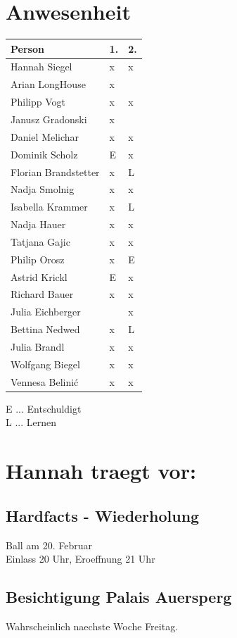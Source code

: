 \documentclass[12pt]{article}
\begin{document}
\ofoot{\pagemark }

\section{Anwesenheit}
  \begin{tabular}{ | p{} | p{} |  p{} |}
    \hline
\textbf{Person} & \textbf{1.} & \textbf{2.}  \\ 
    \hline 
    \hline
 
Hannah Siegel & x & x\\ \hline
Arian LongHouse & x & \\ \hline
Philipp Vogt & x & x\\ \hline
Janusz Gradonski & x & \\ \hline
Daniel Melichar & x &x \\ \hline
Dominik Scholz & E & x\\ \hline
Florian Brandstetter & x & L \\ \hline
Nadja Smolnig & x & x\\ \hline
Isabella Krammer & x & L \\ \hline
Nadja Hauer & x & x \\ \hline
Tatjana Gajic & x & x\\ \hline
Philip Orosz & x & E \\ \hline
Astrid Krickl & E & x \\ \hline
Richard Bauer & x & x \\ \hline
Julia Eichberger & & x\\ \hline
Bettina Nedwed & x & L\\ \hline
Julia Brandl & x & x\\ \hline
Wolfgang Biegel  & x &x \\ \hline
Vennesa Belinić & x &x \\ \hline
  \end{tabular}
  E ... Entschuldigt \\
  L ... Lernen
\newpage
\section{Hannah traegt vor:}
\subsection{Hardfacts - Wiederholung}
Ball am 20. Februar \\
Einlass 20 Uhr, Eroeffnung 21 Uhr
\subsection{Besichtigung Palais Auersperg}
Wahrscheinlich naechste Woche Freitag.
\end{document}
